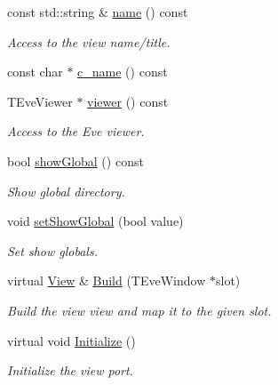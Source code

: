 \begin{DoxyCompactItemize}
const std::string \& \hyperlink{class_d_d4hep_1_1_view_ae5195f3caf77a0e4a7f750a3d69a9089}{name} () const 
\begin{DoxyCompactList}\small\item\em Access to the view name/title. \item\end{DoxyCompactList}\item 
const char $\ast$ \hyperlink{class_d_d4hep_1_1_view_a381c6164fc014a19978c325a848d9a5e}{c\_\-name} () const 
\item 
TEveViewer $\ast$ \hyperlink{class_d_d4hep_1_1_view_aeb1961cc6b9bbe466a81dc6f61833029}{viewer} () const 
\begin{DoxyCompactList}\small\item\em Access to the Eve viewer. \item\end{DoxyCompactList}\item 
bool \hyperlink{class_d_d4hep_1_1_view_a957244259051281c5bdb7e0a2cf264a4}{showGlobal} () const 
\begin{DoxyCompactList}\small\item\em Show global directory. \item\end{DoxyCompactList}\item 
void \hyperlink{class_d_d4hep_1_1_view_a76019e28799e7a10d7678a251edb198d}{setShowGlobal} (bool value)
\begin{DoxyCompactList}\small\item\em Set show globals. \item\end{DoxyCompactList}\item 
virtual \hyperlink{class_d_d4hep_1_1_view}{View} \& \hyperlink{class_d_d4hep_1_1_view_ab4e12874a9cb6a599f268b027443c6ce}{Build} (TEveWindow $\ast$slot)
\begin{DoxyCompactList}\small\item\em Build the view view and map it to the given slot. \item\end{DoxyCompactList}\item 
virtual void \hyperlink{class_d_d4hep_1_1_view_a7a968707a03a2fb140df5f4264708a20}{Initialize} ()
\begin{DoxyCompactList}\small\item\em Initialize the view port. \item\end{DoxyCompactList}\item 

\end{DoxyCompactItemize}
